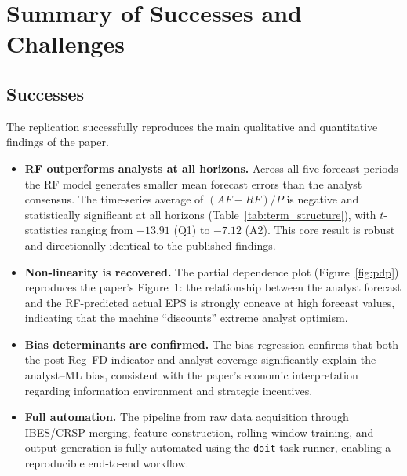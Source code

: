 \documentclass[12pt]{article}
\begin{document}
\section{Summary of Successes and Challenges}

\subsection{Successes}

The replication successfully reproduces the main qualitative and quantitative
findings of the paper.

\begin{itemize}

  \item \textbf{RF outperforms analysts at all horizons.}  Across all five
  forecast periods the RF model generates smaller mean forecast errors than
  the analyst consensus.  The time-series average of $(AF-RF)/P$ is
  negative and statistically significant at all horizons
  (Table~\ref{tab:term_structure}), with $t$-statistics ranging from
  $-13.91$ (Q1) to $-7.12$ (A2).  This core result is robust and
  directionally identical to the published findings.

  \item \textbf{Non-linearity is recovered.}  The partial dependence plot
  (Figure~\ref{fig:pdp}) reproduces the paper's Figure~1: the relationship
  between the analyst forecast and the RF-predicted actual EPS is strongly
  concave at high forecast values, indicating that the machine ``discounts''
  extreme analyst optimism.

  \item \textbf{Bias determinants are confirmed.}  The bias regression
  confirms that both the post-Reg~FD indicator and analyst coverage
  significantly explain the analyst--ML bias, consistent with the paper's
  economic interpretation regarding information environment and strategic
  incentives.

  \item \textbf{Full automation.}  The pipeline from raw data acquisition
  through IBES/CRSP merging, feature construction, rolling-window training,
  and output generation is fully automated using the \texttt{doit} task
  runner, enabling a reproducible end-to-end workflow.

\end{itemize}
\end{document}

